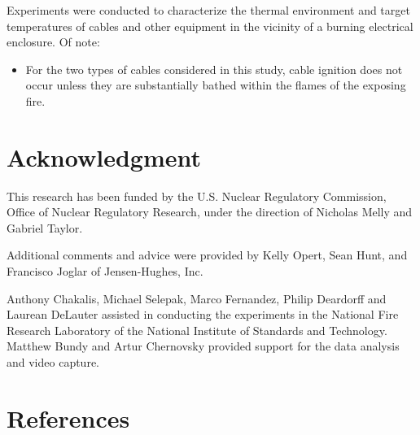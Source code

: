 \documentclass[12pt]{article}
\begin{document}
Experiments were conducted to characterize the thermal environment and target temperatures of cables and other equipment in the vicinity of a burning electrical enclosure. Of note:
\begin{itemize}
\item For the two types of cables considered in this study, cable ignition does not occur unless they are substantially bathed within the flames of the exposing fire.
\end{itemize}



\section{Acknowledgment}

This research has been funded by the U.S. Nuclear Regulatory Commission, Office of Nuclear Regulatory Research, under the direction of Nicholas Melly and Gabriel Taylor.

Additional comments and advice were provided by Kelly Opert, Sean Hunt, and Francisco Joglar of Jensen-Hughes, Inc.

Anthony Chakalis, Michael Selepak, Marco Fernandez, Philip Deardorff and Laurean DeLauter assisted in conducting the experiments in the National Fire Research Laboratory of the National Institute of Standards and Technology. Matthew Bundy and Artur Chernovsky provided support for the data analysis and video capture.



\clearpage
\section*{References}


\end{document}
